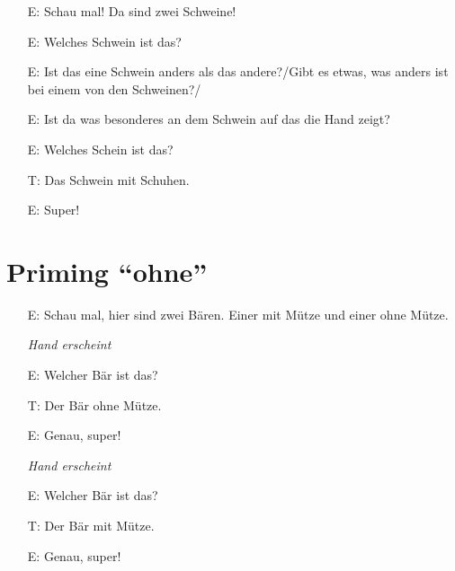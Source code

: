 \documentclass[11pt, oneside]{article}   	%
\begin{document}
\begin{itemize}
\item [E:] Schau mal! Da sind zwei Schweine!
\end{itemize}


\begin{itemize}
\item [E:] Welches Schwein ist das?
\end{itemize}


\begin{itemize}
\item[E:] Ist das eine Schwein anders als das andere?/Gibt es etwas, was anders ist bei einem von den Schweinen?/
\item[E:]  Ist da was besonderes an dem Schwein auf das die Hand zeigt?
\end {itemize}


\begin{itemize}
\item [E:] Welches Schein ist das?
\item [T:] Das Schwein mit Schuhen.
\item [E:] Super!
\end{itemize}



\section{Priming ``ohne''}
\begin{itemize}
\item [E:] Schau mal, hier sind zwei Bären. Einer mit Mütze und einer ohne Mütze.
\item [] \textit{Hand erscheint}
\item [E:] Welcher Bär ist das?
\item [T:]Der Bär ohne Mütze.
\item [E:] Genau, super!
\item [] \textit{Hand erscheint}
\item [E:] Welcher Bär ist das?
\item [T:] Der Bär mit Mütze.
\item [E:] Genau, super!
\end{itemize}
\end{document}
